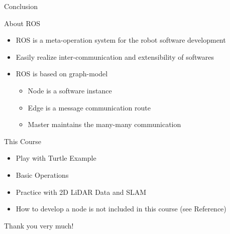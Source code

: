 \documentclass[10pt]{beamer}
\begin{document}
 \begin{frame}{Conclusion}
 \begin{block}{About ROS}
  \begin{itemize}
   \item ROS is a meta-operation system for the robot software development
   \item Easily realize inter-communication and extensibility of softwares
   \item ROS is based on graph-model
   \begin{itemize}
    \item Node is a software instance
    \item Edge is a message communication route
    \item Master maintains the many-many communication
   \end{itemize}
  \end{itemize}

 \end{block}
 
 \begin{block}{This Course}
  \begin{itemize}
   \item Play with Turtle Example
   \item Basic Operations
   \item Practice with 2D LiDAR Data and SLAM
   \item How to develop a node is not included in this course (see Reference)
  \end{itemize}
 \end{block}
 
 
 
 \end{frame}
 
     \begin{frame}{}
  \begin{center}
   \LARGE Thank you very much!
  \end{center}
 \end{frame}
 
\end{document}

